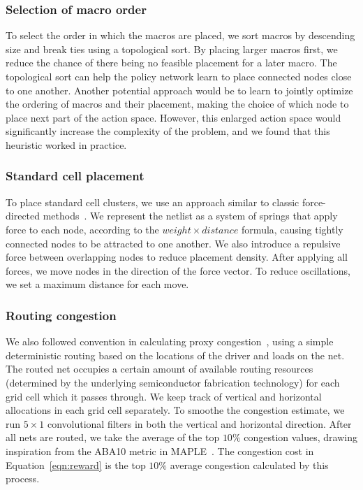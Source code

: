 \documentclass{article}
\begin{document}


\subsubsection{Selection of macro order}
\label{section:selecting_macro_order}
To select the order in which the macros are placed, we sort macros by descending size and break ties using a topological sort. By placing larger macros first, we reduce the chance of there being no feasible placement for a later macro. The topological sort can help the policy network learn to place connected nodes close to one another. Another potential approach would be to learn to jointly optimize the ordering of macros and their placement, making the choice of which node to place next part of the action space. However, this enlarged action space would significantly increase the complexity of the problem, and we found that this heuristic worked in practice.

\subsubsection{Standard cell placement}
\label{section:standard_cell_placement}
To place standard cell clusters, we use an approach similar to classic force-directed methods~\cite{hpwl1991}. We represent the netlist as a system of springs that apply force to each node, according to the $weight\times distance$ formula, causing tightly connected nodes to be attracted to one another. We also introduce a repulsive force between overlapping nodes to reduce placement density. After applying all forces, we move nodes in the direction of the force vector. To reduce oscillations, we set a maximum distance for each move.

\subsubsection{Routing congestion}
\label{section:congestion}
We also followed convention in calculating proxy congestion~\cite{MAPLE12}, using a simple deterministic routing based on the locations of the driver and loads on the net. The routed net occupies a certain amount of available routing resources (determined by the underlying semiconductor fabrication technology) for each grid cell which it passes through. We keep track of vertical and horizontal allocations in each grid cell separately. To smoothe the congestion estimate, we run $5\times 1$ convolutional filters in both the vertical and horizontal direction. After all nets are routed, we take the average of the top $10\%$ congestion values, drawing inspiration from the ABA10 metric in MAPLE~\cite{MAPLE12}. The congestion cost in Equation~\ref{eqn:reward} is the top $10\%$ average congestion calculated by this process.
\end{document}
